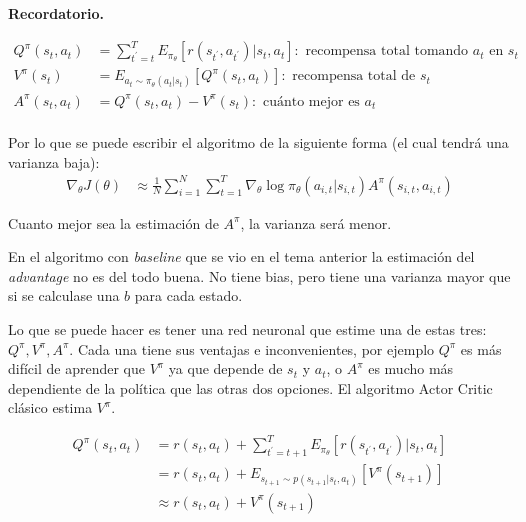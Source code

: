 \textbf{Recordatorio.}

\begin{align}
    Q ^ { \pi } ( s _ { t } , a _ { t } ) &= \sum _ { t ^ { \prime } = t } ^ { T } E _ { \pi _ {
\theta } } [ r ( s _ { t ^ { \prime } } , a _ { t ^ { \prime } } ) | s _ { t } , a _ { t } ] :
\text { recompensa total tomando } a _ { t } \text { en } s _ { t }\\
            V ^ { \pi } ( s _ { t } ) &= E _ { a _ { t } \sim \pi _ { \theta } ( a _ { t } | s _ { t } ) } [ Q
            ^ { \pi } ( s _ { t } , a _ { t } ) ]: \text{ recompensa total de } s_t\\
            A ^ { \pi } ( s _ { t } , a _ { t } ) &= Q ^ { \pi } ( s _ { t } , a _ { t } ) - V ^ { \pi } ( s _
{ t } ) : \text { cuánto mejor es } a _ { t }\\
\end{align}

Por lo que se puede escribir el algoritmo de la siguiente forma (el cual tendrá una varianza
baja):
\begin{align}
            \nabla _ { \theta } J ( \theta ) &\approx \frac { 1 } { N } \sum _ { i = 1 } ^ { N } \sum _ { t =
1 } ^ { T } \nabla _ { \theta } \operatorname { log } \pi _ { \theta } ( a _ { i , t } | s _ { i
, t } ) A ^ { \pi } ( s _ { i , t } , a _ { i , t } )
\end{align}

Cuanto mejor sea la estimación de $A^\pi$, la varianza será menor.

En el algoritmo con \textit{baseline} que se vio en el tema anterior la estimación del
\textit{advantage} no es del todo buena. No tiene bias, pero tiene una varianza mayor que
si se calculase una $b$ para cada estado.

Lo que se puede hacer es tener una red neuronal que estime una de estas tres: $Q^\pi, V^\pi, A^\pi$. 
Cada una tiene sus ventajas e inconvenientes, por ejemplo $Q^\pi$ es más difícil de
aprender que  $V^\pi$ ya que depende de  $s_t$ y  $a_t$, o  $A^\pi$ es mucho más dependiente de
la política que las otras dos opciones. El algoritmo Actor Critic clásico estima  $V^\pi$.

\begin{align}
    Q ^ { \pi } ( s _ { t } , a _ { t } ) &= r ( s _ { t } , a _ { t } ) + \sum _ { t ^ { \prime } = t
+ 1 } ^ { T } E _ { \pi _ { \theta } } [ r ( s _ { t ^ { \prime } } , a _ { t ^ { \prime } } ) |
s _ { t } , a _ { t } ]\\
&= r ( s _ { t } , a _ { t } ) + E _ { s _ { t + 1 } \sim p ( s _ { t + 1 } | s _ { t } , a _ { t
} ) } [ V ^ { \pi } ( s _ { t + 1 } ) ]\\
&\approx r ( s _ { t } , a _ { t } ) + V ^ { \pi } ( s _ { t + 1 } )
\end{align}

